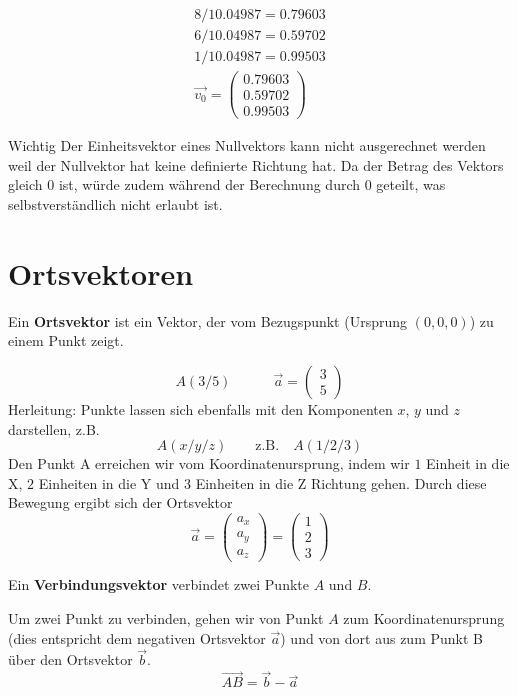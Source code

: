 \begin{eqnarray*}
	8 / 10.04987 = 0.79603\\
	6 / 10.04987 = 0.59702\\
	1 / 10.04987 = 0.99503\\
	\vec{v_0} = \begin{pmatrix}0.79603\\0.59702\\0.99503\end{pmatrix}
\end{eqnarray*}

Wichtig
Der Einheitsvektor eines Nullvektors kann nicht ausgerechnet werden weil der Nullvektor hat keine definierte Richtung hat. Da der Betrag des Vektors gleich 0 ist, würde zudem während der Berechnung durch 0 geteilt, was selbstverständlich nicht erlaubt ist.

\section{Ortsvektoren}
\begin{mydef}Ein \textbf{Ortsvektor} ist ein Vektor, der vom Bezugspunkt (Ursprung $(0,0,0)$) zu einem Punkt zeigt.\end{mydef}
\begin{equation*}
A(3/5) \quad\quad\quad \vec{a} = \begin{pmatrix}3\\5 \end{pmatrix}
\end{equation*}
Herleitung: Punkte lassen sich ebenfalls mit den Komponenten $x$, $y$ und $z$ darstellen, z.B.
\begin{equation*}
A(x/y/z)\quad\quad \mbox{z.B.}\quad A(1/2/3)
\end{equation*}
Den Punkt A erreichen wir vom Koordinatenursprung, indem wir $1$ Einheit in die X, $2$ Einheiten in die Y und $3$ Einheiten in die Z Richtung gehen. Durch diese Bewegung ergibt sich der Ortsvektor
\begin{equation*}
\vec{a} = \begin{pmatrix}a_x\\a_y\\a_z\end{pmatrix} = \begin{pmatrix}1\\2\\3\end{pmatrix}
\end{equation*}
\begin{mydef}
Ein \textbf{Verbindungsvektor} verbindet zwei Punkte $A$ und $B$. \end{mydef}
\noindent Um zwei Punkt zu verbinden, gehen wir von Punkt $A$ zum Koordinatenursprung (dies entspricht dem negativen Ortsvektor $\vec{a}$) und von dort aus zum Punkt B über den Ortsvektor $\vec{b}$.
\begin{equation*}\vec{AB} = \vec{b} - \vec{a}\end{equation*}
